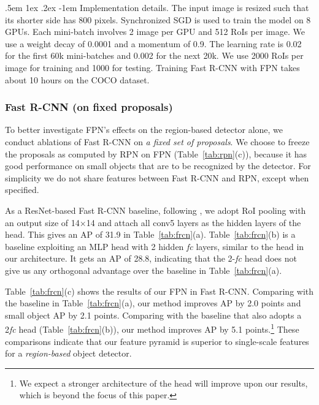 \documentclass[10pt,twocolumn,letterpaper]{article}
\makeatletter
\renewcommand\paragraph{\@startsection{paragraph}{4}{\z@}%
  {.5em \@plus1ex \@minus.2ex}%
  {-1em}%
  {\normalfont\normalsize\bfseries}}
\makeatother
\begin{document}
\paragraph{Implementation details.}
The input image is resized such that its shorter side has 800 pixels.
Synchronized SGD is used to train the model on 8 GPUs.
Each mini-batch involves 2 image per GPU and 512 RoIs per image.
We use a weight decay of 0.0001 and a momentum of 0.9.
The learning rate is 0.02 for the first 60k mini-batches and 0.002 for the next 20k.
We use 2000 RoIs per image for training and 1000 for testing. Training Fast R-CNN with FPN takes about 10 hours on the COCO dataset.

\subsubsection{Fast R-CNN (on fixed proposals)}

To better investigate FPN's effects on the region-based detector alone, we conduct ablations of Fast R-CNN on \emph{a fixed set of proposals}.
We choose to freeze the proposals as computed by RPN on FPN (Table~\ref{tab:rpn}(c)), because it has good performance on small objects that are to be recognized by the detector.
For simplicity we do not share features between Fast R-CNN and RPN, except when specified.

As a ResNet-based Fast R-CNN baseline, following \cite{He2016}, we adopt RoI pooling with an output size of 14$\times$14 and attach all conv5 layers as the hidden layers of the head.
This gives an AP of 31.9 in Table~\ref{tab:frcn}(a).
Table~\ref{tab:frcn}(b) is a baseline exploiting an MLP head with 2 hidden \emph{fc} layers, similar to the head in our architecture. It gets an AP of 28.8, indicating that the 2-\emph{fc} head does not give us any orthogonal advantage over the baseline in Table~\ref{tab:frcn}(a).

Table~\ref{tab:frcn}(c) shows the results of our FPN in Fast R-CNN.
Comparing with the baseline in Table~\ref{tab:frcn}(a), our method improves AP by 2.0 points and small object AP by 2.1 points.
Comparing with the baseline that also adopts a 2\emph{fc} head (Table~\ref{tab:frcn}(b)), our method improves AP by 5.1 points.\footnote{We expect a stronger architecture of the head \cite{Ren2015} will improve upon our results, which is beyond the focus of this paper.}
These comparisons indicate that our feature pyramid is superior to single-scale features for a \emph{region-based} object detector.
\end{document}
